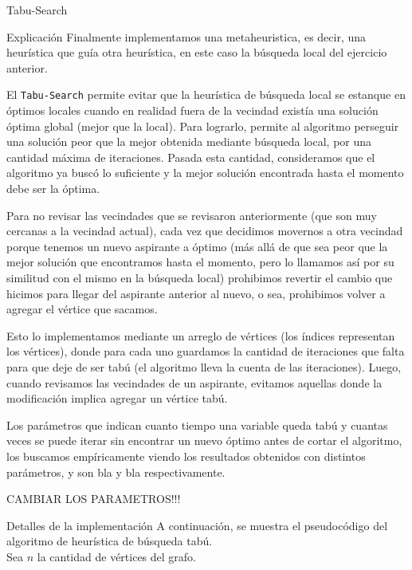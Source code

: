 \begin{section}{Tabu-Search}
	\begin{subsection}{Explicación}
		Finalmente implementamos una metaheuristica, es decir, una heurística que guía otra heurística, en este caso la búsqueda local del ejercicio anterior.

		El \texttt{Tabu-Search} permite evitar que la heurística de búsqueda local se estanque en óptimos locales cuando en realidad fuera de la vecindad existía una solución óptima global (mejor que la local).
		Para lograrlo, permite al algoritmo perseguir una solución peor que la mejor obtenida mediante búsqueda local, por una cantidad máxima de iteraciones.
		Pasada esta cantidad, consideramos que el algoritmo ya buscó lo suficiente y la mejor solución encontrada hasta el momento debe ser la óptima.

		Para no revisar las vecindades que se revisaron anteriormente (que son muy cercanas a la vecindad actual),
		cada vez que decidimos movernos a otra vecindad porque tenemos un nuevo aspirante a óptimo (más allá de que sea peor que la mejor solución que encontramos hasta el momento, pero lo llamamos así por su similitud con el mismo en la búsqueda local)
		prohibimos revertir el cambio que hicimos para llegar del aspirante anterior al nuevo, o sea, prohibimos volver a agregar el vértice que sacamos.

		Esto lo implementamos mediante un arreglo de vértices (los índices representan los vértices), donde para cada uno guardamos la cantidad de iteraciones que falta para que deje de ser tabú (el algoritmo lleva la cuenta de las iteraciones).
		Luego, cuando revisamos las vecindades de un aspirante, evitamos aquellas donde la modificación implica agregar un vértice tabú.

		Los parámetros que indican cuanto tiempo una variable queda tabú y cuantas veces se puede iterar sin encontrar un nuevo óptimo antes de cortar el algoritmo, los buscamos empíricamente viendo los resultados obtenidos con distintos parámetros, y son bla y bla respectivamente.

		CAMBIAR LOS PARAMETROS!!!
	\end{subsection}
	\begin{subsection}{Detalles de la implementación}
		A continuación, se muestra el pseudocódigo del algoritmo de heurística de búsqueda tabú.\\

		Sea $n$ la cantidad de vértices del grafo.


\end{subsection}
\end{section}
